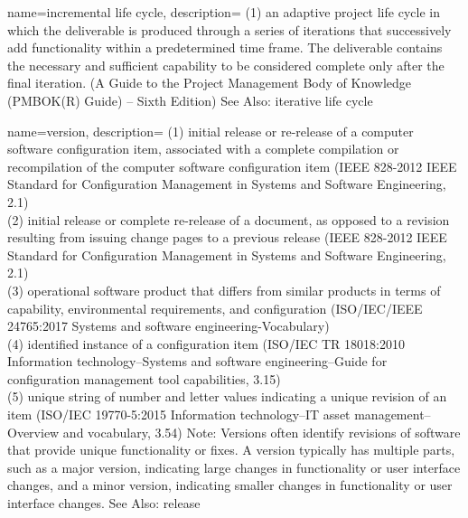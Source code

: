{
    name={incremental life cycle},
    description=
    {
        (1) an adaptive project life cycle in which the deliverable is produced through a series of iterations that successively add functionality within a predetermined time frame. The deliverable contains the necessary and sufficient capability to be considered complete only after the final iteration. (A Guide to the Project Management Body of Knowledge (PMBOK(R) Guide) -- Sixth Edition) See Also: iterative life cycle
    }
}

{
    name={version},
    description=
    {   (1) initial release or re-release of a computer software configuration item, associated with a complete compilation or recompilation of the computer software configuration item (IEEE 828-2012 IEEE Standard for Configuration Management in Systems and Software Engineering, 2.1) \\
        (2) initial release or complete re-release of a document, as opposed to a revision resulting from issuing change pages to a previous release (IEEE 828-2012 IEEE Standard for Configuration Management in Systems and Software Engineering, 2.1) \\
        (3) operational software product that differs from similar products in terms of capability, environmental requirements, and configuration (ISO/IEC/IEEE 24765:2017 Systems and software engineering-Vocabulary) \\
        (4) identified instance of a configuration item (ISO/IEC TR 18018:2010 Information technology--Systems and software engineering--Guide for configuration management tool capabilities, 3.15) \\
        (5) unique string of number and letter values indicating a unique revision of an item (ISO/IEC 19770-5:2015 Information technology--IT asset management--Overview and vocabulary, 3.54) Note: Versions often identify revisions of software that provide unique functionality or fixes. A version typically has multiple parts, such as a major version, indicating large changes in functionality or user interface changes, and a minor version, indicating smaller changes in functionality or user interface changes. See Also: release
    }
}

